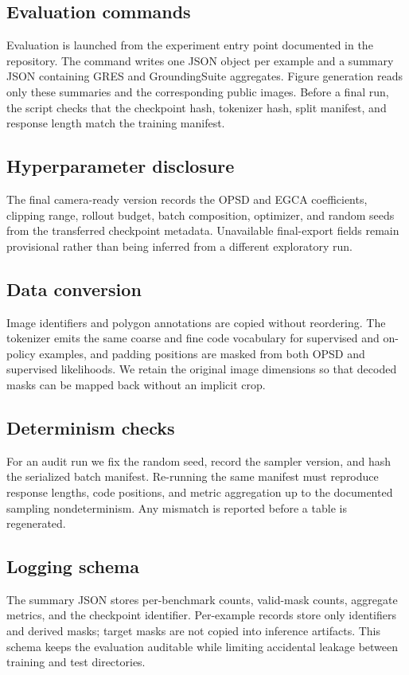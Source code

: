 \documentclass{article}
\begin{document}
\subsection{Evaluation commands}Evaluation is launched from the experiment entry point documented in the repository. The command writes one JSON object per example and a summary JSON containing GRES and GroundingSuite aggregates. Figure generation reads only these summaries and the corresponding public images. Before a final run, the script checks that the checkpoint hash, tokenizer hash, split manifest, and response length match the training manifest.
\subsection{Hyperparameter disclosure}The final camera-ready version records the OPSD and EGCA coefficients, clipping range, rollout budget, batch composition, optimizer, and random seeds from the transferred checkpoint metadata. Unavailable final-export fields remain provisional rather than being inferred from a different exploratory run.
\subsection{Data conversion}Image identifiers and polygon annotations are copied without reordering. The tokenizer emits the same coarse and fine code vocabulary for supervised and on-policy examples, and padding positions are masked from both OPSD and supervised likelihoods. We retain the original image dimensions so that decoded masks can be mapped back without an implicit crop.
\subsection{Determinism checks}For an audit run we fix the random seed, record the sampler version, and hash the serialized batch manifest. Re-running the same manifest must reproduce response lengths, code positions, and metric aggregation up to the documented sampling nondeterminism. Any mismatch is reported before a table is regenerated.
\subsection{Logging schema}The summary JSON stores per-benchmark counts, valid-mask counts, aggregate metrics, and the checkpoint identifier. Per-example records store only identifiers and derived masks; target masks are not copied into inference artifacts. This schema keeps the evaluation auditable while limiting accidental leakage between training and test directories.
\end{document}
